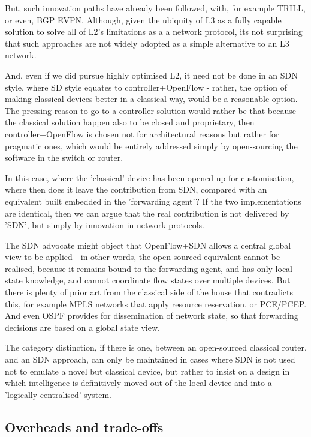 But, such innovation paths have already been followed, with, for example TRILL, or even, BGP EVPN.  Although, given the ubiquity of L3 as a fully capable solution to solve all of L2's limitations as a a network protocol, its not surprising that such approaches are not widely adopted as a simple alternative to an L3 network.

And, even if we did pursue highly optimised L2, it need not be done in an SDN style, where SD style equates to controller+OpenFlow - rather, the option of making classical devices better in a classical way, would be a reasonable option.  The pressing reason to go to a controller solution would rather be that because the classical solution happen also to be closed and proprietary, then controller+OpenFlow is chosen not for architectural reasons but rather for pragmatic ones, which would be entirely addressed simply by open-sourcing the software in the switch or router.

In this case, where the 'classical' device has been opened up for customisation, where then does it leave the contribution from SDN, compared with an equivalent built embedded in the 'forwarding agent'?  If the two implementations are identical, then we can argue that the real contribution is not delivered by 'SDN', but simply by innovation in network protocols.

The SDN advocate might object that OpenFlow+SDN allows a central global view to be applied - in other words, the open-sourced equivalent cannot be realised, because it remains bound to the forwarding agent, and has only local state knowledge, and cannot coordinate flow states over multiple devices.  But there is plenty of prior art from the classical side of the house that contradicts this, for example MPLS networks that apply resource reservation, or PCE/PCEP.  And even OSPF provides for dissemination of network state, so that forwarding decisions are based on a global state view.

The category distinction, if there is one, between an open-sourced classical router, and an SDN approach, can only be maintained in cases where SDN is not used not to emulate a novel but classical device, but rather to insist on a design in which intelligence is definitively moved out of the local device and into a 'logically centralised' system.


\subsection{Overheads and trade-offs}

